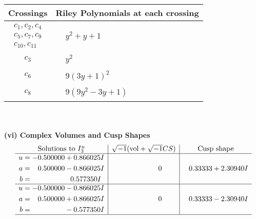 \documentclass[1p]{elsarticle_modified}
\theoremstyle{definition}
\newcommand{\I}{\sqrt{-1}}
\begin{document}
\begin{tabular}{m{50pt}|m{274pt}}
Crossings & \hspace{64pt}Riley Polynomials at each crossing \\
\hline $$\begin{aligned}c_{1},c_{2},c_{4}\\c_{5},c_{7},c_{9}\\c_{10},c_{11}\end{aligned}$$&$\begin{aligned}
&y^2+y+1
\end{aligned}$\\
\hline $$\begin{aligned}c_{3}\end{aligned}$$&$\begin{aligned}
&y^2
\end{aligned}$\\
\hline $$\begin{aligned}c_{6}\end{aligned}$$&$\begin{aligned}
&9(3 y+1)^2
\end{aligned}$\\
\hline $$\begin{aligned}c_{8}\end{aligned}$$&$\begin{aligned}
&9(9 y^2-3 y+1)
\end{aligned}$\\
\hline
\end{tabular}\\~\\
\newpage\flushleft \textbf{(vi) Complex Volumes and Cusp Shapes}
$$\begin{array}{c|c|c}  
\text{Solutions to }I^u_{3}& \I (\text{vol} + \sqrt{-1}CS) & \text{Cusp shape}\\
 \hline 
\begin{aligned}
u &= -0.500000 + 0.866025 I \\
a &= \phantom{-}0.500000 - 0.866025 I \\
b &= \phantom{-0.000000 -}0.577350 I\end{aligned}
 & \phantom{-0.000000 } 0 & \phantom{-}0.33333 + 2.30940 I \\ \hline\begin{aligned}
u &= -0.500000 - 0.866025 I \\
a &= \phantom{-}0.500000 + 0.866025 I \\
b &= \phantom{-0.000000 } -0.577350 I\end{aligned}
 & \phantom{-0.000000 } 0 & \phantom{-}0.33333 - 2.30940 I\\
 \hline 
 \end{array}$$\newpage
\end{document}
